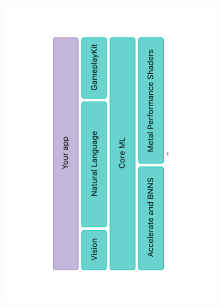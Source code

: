 \documentclass[14pt,a4paper]{article}
\begin{document}
\begin{figure}[h]
\centering
\includegraphics[scale=.5,angle=270]{coreML.pdf}
\end{figure}
\end{document}
